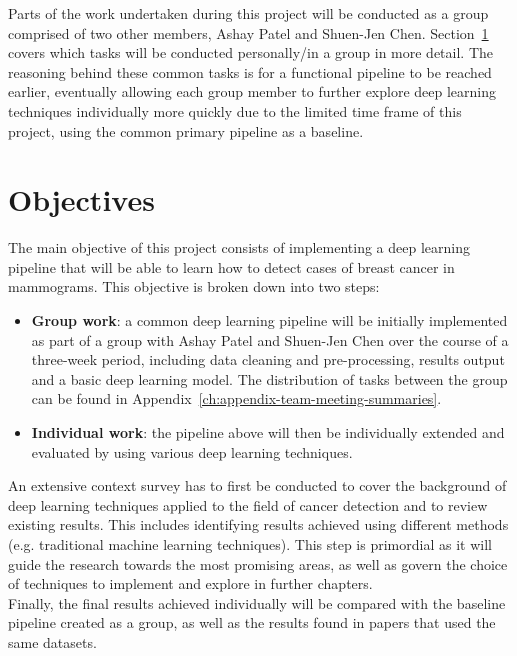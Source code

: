 Parts of the work undertaken during this project will be conducted as a group comprised of two other members, Ashay Patel and Shuen-Jen Chen. Section~\ref{sec:introduction-objectives} covers which tasks will be conducted personally/in a group in more detail. The reasoning behind these common tasks is for a functional pipeline to be reached earlier, eventually allowing each group member to further explore deep learning techniques individually more quickly due to the limited time frame of this project, using the common primary pipeline as a baseline.


\section{Objectives}
\label{sec:introduction-objectives}

The main objective of this project consists of implementing a deep learning pipeline that will be able to learn how to detect cases of breast cancer in mammograms. This objective is broken down into two steps:
\begin{itemize}
    \item \textbf{Group work}: a common deep learning pipeline will be initially implemented as part of a group with Ashay Patel and Shuen-Jen Chen over the course of a three-week period, including data cleaning and pre-processing, results output and a basic deep learning model. The distribution of tasks between the group can be found in Appendix~\ref{ch:appendix-team-meeting-summaries}.
    \item \textbf{Individual work}: the pipeline above will then be individually extended and evaluated by using various deep learning techniques.
\end{itemize}

An extensive context survey has to first be conducted to cover the background of deep learning techniques applied to the field of cancer detection and to review existing results. This includes identifying results achieved using different methods (e.g. traditional machine learning techniques). This step is primordial as it will guide the research towards the most promising areas, as well as govern the choice of techniques to implement and explore in further chapters.\\

Finally, the final results achieved individually will be compared with the baseline pipeline created as a group, as well as the results found in papers that used the same datasets.

